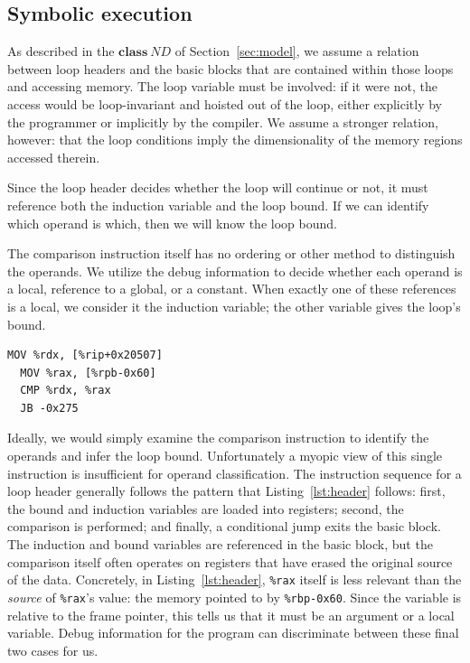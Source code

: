 \subsection{Symbolic execution}

As described in the $\textbf{class} \ ND$ of Section~\ref{sec:model},
we assume a relation between loop headers and the basic blocks that are
contained within those loops and accessing memory.  The loop variable
must be involved: if it were not, the access would be loop-invariant
and hoisted out of the loop, either explicitly by the programmer or
implicitly by the compiler.  We assume a stronger relation, however:
that the loop conditions imply the dimensionality of the memory regions
accessed therein.


Since the loop header decides whether the loop will continue or not, it
must reference both the induction variable and the loop bound.  If we
can identify which operand is which, then we will know the loop bound.

The comparison instruction itself has no ordering or other method to
distinguish the operands.  We utilize the debug information to decide
whether each operand is a local, reference to a global, or a constant.
When exactly one of these references is a local, we consider it the
induction variable; the other variable gives the loop's bound.

\begin{lstlisting}[label=lst:header,caption=Instructions within a
sample loop header.  Both the induction variable and the loop bound
appear as arguments to the \texttt{CMP} instruction.  The preceding
instructions are still necessary for distinguishing between the two
variables.]
  MOV %rdx, [%rip+0x20507]
  MOV %rax, [%rpb-0x60]
  CMP %rdx, %rax
  JB -0x275
\end{lstlisting}

Ideally, we would simply examine the comparison instruction to identify
the operands and infer the loop bound. Unfortunately a myopic view of
this single instruction is insufficient for operand classification.
The instruction sequence for a loop header generally follows the
pattern that
Listing~\ref{lst:header} follows: first, the bound and induction
variables are loaded into registers; second, the comparison is
performed; and finally, a conditional jump exits the basic block.  The
induction and bound variables are referenced in the basic block, but
the comparison itself often operates on registers that have erased the
original source of the data.  Concretely, in Listing~\ref{lst:header},
\texttt{\%rax} itself is less relevant than the \emph{source} of
\texttt{\%rax}'s
value: the memory pointed to by \texttt{\%rbp-0x60}.  Since the variable
is relative to the frame pointer, this tells us that it must be an
argument or a local variable.  Debug information for the program can
discriminate between these final two cases for us.

